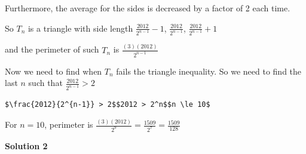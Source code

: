 \begin{enumerate}
Furthermore, the average for the sides is decreased by a factor of 2 each time.

 So $T_n$ is a triangle with side length $\frac{2012}{2^{n- 1}} - 1$, $\frac{2012}{2^{n-1}}$, $\frac{2012}{2^{n-1}} + 1$

 and the perimeter of such $T_n$ is $\frac{(3)(2012)}{2^{n-1}}$

 
Now we need to find when $T_n$ fails the triangle inequality. So we need to find the last $n$ such that $\frac{2012}{2^{n-1}} > 2$
\begin{verbatim}
$\frac{2012}{2^{n-1}} > 2$$2012 > 2^n$$n \le 10$
\end{verbatim}

For $n = 10$, perimeter is $\frac{(3)(2012)}{2^{9}} = \frac{1509}{2^7} = \frac{1509}{128}$




\textbf{Solution 2}


\end{enumerate}

